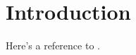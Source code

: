 \chapter{Introduction\label{chap:intro}}

Here's a reference to .
\lipsum[80]

\lipsum[5]

\lipsum[6-35]
